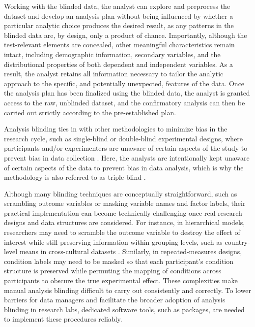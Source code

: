 \documentclass[
]{jss}
\begin{document}
Working with the blinded data, the analyst can explore and preprocess
the dataset and develop an analysis plan without being influenced by
whether a particular analytic choice produces the desired result, as any
patterns in the blinded data are, by design, only a product of chance.
Importantly, although the test-relevant elements are concealed, other
meaningful characteristics remain intact, including demographic
information, secondary variables, and the distributional properties of
both dependent and independent variables. As a result, the analyst
retains all information necessary to tailor the analytic approach to the
specific, and potentially unexpected, features of the data. Once the
analysis plan has been finalized using the blinded data, the analyst is
granted access to the raw, unblinded dataset, and the confirmatory
analysis can then be carried out strictly according to the
pre-established plan.

Analysis blinding ties in with other methodologies to minimize bias in
the research cycle, such as single-blind or double-blind experimental
designs, where participants and/or experimenters are unaware of certain
aspects of the study to prevent bias in data collection
\citep{schulz2002blinding}. Here, the analysts are intentionally kept
unaware of certain aspects of the data to prevent bias in data analysis,
which is why the methodology is also referred to as triple-blind
\citep{schulz2002blinding}.

Although many blinding techniques are conceptually straightforward, such
as scrambling outcome variables or masking variable names and factor
labels, their practical implementation can become technically
challenging once real research designs and data structures are
considered. For instance, in hierarchical models, researchers may need
to scramble the outcome variable to destroy the effect of interest while
still preserving information within grouping levels, such as
country-level means in cross-cultural datasets
\citep[e.g.,][]{sarafoglou2023comparing}. Similarly, in
repeated-measures designs, condition labels may need to be masked so
that each participant's condition structure is preserved while permuting
the mapping of conditions across participants to obscure the true
experimental effect. These complexities make manual analysis blinding
difficult to carry out consistently and correctly. To lower barriers for
data managers and facilitate the broader adoption of analysis blinding
in research labs, dedicated software tools, such as 
packages, are needed to implement these procedures reliably.
\end{document}
